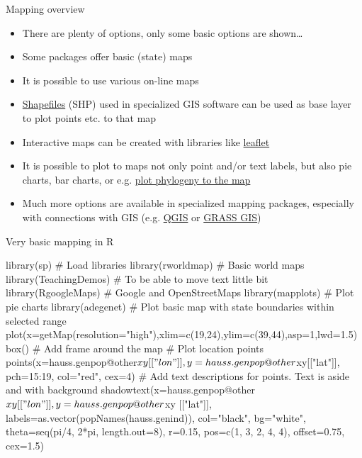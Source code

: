 \documentclass[compress, xelatex, 11pt, xcolor=svgnames, aspectratio=169, url={hyphens, lowtilde}]{beamer}
\begin{document}
\begin{frame}{Mapping overview}
	\begin{itemize}
		\item There are plenty of options, only some basic options are shown\ldots
		\item Some packages offer basic (state) maps
		\item It is possible to use various on-line maps
		\item \href{https://en.wikipedia.org/wiki/Shapefile}{Shapefiles} (SHP) used in specialized GIS software can be used as base layer to plot points etc. to that map
		\item Interactive maps can be created with libraries like \href{https://CRAN.R-project.org/package=leaflet}{leaflet}
		\item It is possible to plot to maps not only point and/or text labels, but also pie charts, bar charts, or e.g. \href{https://blog.phytools.org/2019/03/projecting-phylogenetic-tree-onto-map.html}{plot phylogeny to the map}
		\item Much more options are available in specialized mapping packages, especially with connections with GIS (e.g. \href{https://qgis.org/}{QGIS} or \href{https://grass.osgeo.org/}{GRASS GIS})
	\end{itemize}
\end{frame}

\begin{frame}[fragile]{Very basic mapping in R}
	\begin{spluscode}
    library(sp) # Load libraries
    library(rworldmap) # Basic world maps
    library(TeachingDemos) # To be able to move text little bit
    library(RgoogleMaps) # Google and OpenStreetMaps
    library(mapplots) # Plot pie charts
    library(adegenet)
    # Plot basic map with state boundaries within selected range
    plot(x=getMap(resolution="high"),xlim=c(19,24),ylim=c(39,44),asp=1,lwd=1.5)
    box() # Add frame around the map
    # Plot location points
    points(x=hauss.genpop@other$xy[["lon"]], y=hauss.genpop@other$xy[["lat"]],
      pch=15:19, col="red", cex=4)
    # Add text descriptions for points. Text is aside and with background
    shadowtext(x=hauss.genpop@other$xy[["lon"]], y=hauss.genpop@other$xy
      [["lat"]], labels=as.vector(popNames(hauss.genind)), col="black",
      bg="white", theta=seq(pi/4, 2*pi, length.out=8), r=0.15, pos=c(1,
      3, 2, 4, 4), offset=0.75, cex=1.5)
	\end{spluscode}
\end{frame}
\end{document}
